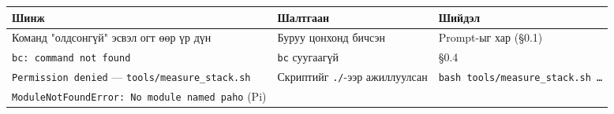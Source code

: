 \begingroup\scriptsize\begin{longtable}[]{@{}lll@{}}
\toprule
\begin{minipage}[b]{0.30\columnwidth}\raggedright
Шинж\strut
\end{minipage} & \begin{minipage}[b]{0.30\columnwidth}\raggedright
Шалтгаан\strut
\end{minipage} & \begin{minipage}[b]{0.30\columnwidth}\raggedright
Шийдэл\strut
\end{minipage}\tabularnewline
\midrule
\endhead
\begin{minipage}[t]{0.30\columnwidth}\raggedright
Команд "олдсонгүй" эсвэл огт өөр үр дүн\strut
\end{minipage} & \begin{minipage}[t]{0.30\columnwidth}\raggedright
Буруу цонхонд бичсэн\strut
\end{minipage} & \begin{minipage}[t]{0.30\columnwidth}\raggedright
Prompt-ыг хар (§0.1)\strut
\end{minipage}\tabularnewline
\begin{minipage}[t]{0.30\columnwidth}\raggedright
\texttt{bc:\allowbreak{}\ command\ not\ found}\strut
\end{minipage} & \begin{minipage}[t]{0.30\columnwidth}\raggedright
\texttt{bc} суугаагүй\strut
\end{minipage} & \begin{minipage}[t]{0.30\columnwidth}\raggedright
§0.4\strut
\end{minipage}\tabularnewline
\begin{minipage}[t]{0.30\columnwidth}\raggedright
\texttt{Permission\ denied} --- \texttt{tools/\allowbreak{}measure\_\allowbreak{}stack.\allowbreak{}sh}\strut
\end{minipage} & \begin{minipage}[t]{0.30\columnwidth}\raggedright
Скриптийг \texttt{./}-ээр ажиллуулсан\strut
\end{minipage} & \begin{minipage}[t]{0.30\columnwidth}\raggedright
\texttt{bash\ tools/\allowbreak{}measure\_\allowbreak{}stack.\allowbreak{}sh\ \ldots{}}\strut
\end{minipage}\tabularnewline
\begin{minipage}[t]{0.30\columnwidth}\raggedright
\texttt{ModuleNotFoundError:\ No\ module\ named\ \textquotesingle{}paho\textquotesingle{}} (Pi)\strut

\end{minipage}
\end{longtable}
